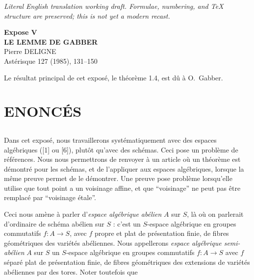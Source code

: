 \documentclass[12pt,a4paper]{article}
\theoremstyle{plain}
\theoremstyle{definition}
\theoremstyle{remark}
\begin{document}
\begin{center}\small\emph{Literal English translation working draft. Formulae, numbering, and TeX structure are preserved; this is not yet a modern recast.}\end{center}
\vspace{0.5em}


\begin{center}
{\Large\bf Expose V}\\[0.5em]
{\LARGE\bf LE LEMME DE GABBER}\\[1em]
{\large Pierre DELIGNE}\\[1em]
{\small Astérisque 127 (1985), 131--150}
\end{center}

\vspace{1em}

\begin{center}
Le résultat principal de cet exposé, le théorème 1.4, est dû à O.~Gabber.
\end{center}

\section{ENONCÉS}

\subsection{} Dans cet exposé, nous travaillerons systématiquement avec des espaces algébriques ([1] ou [6]), plutôt qu'avec des schémas. Ceci pose un problème de références. Nous nous permettrons de renvoyer à un article où un théorème est démontré pour les schémas, et de l'appliquer aux espaces algébriques, lorsque la même preuve permet de le démontrer. Une preuve pose problème lorsqu'elle utilise que tout point a un voisinage affine, et que ``voisinage'' ne peut pas être remplacé par ``voisinage étale''.

Ceci nous amène à parler d'\emph{espace algébrique abélien} $A$ sur $S$, là où on parlerait d'ordinaire de schéma abélien sur $S$ : c'est un $S$-espace algébrique en groupes commutatifs $f : A \to S$, avec $f$ propre et plat de présentation finie, de fibres géométriques des variétés abéliennes. Nous appellerons \emph{espace algébrique semi-abélien} $A$ sur $S$ un $S$-espace algébrique en groupes commutatifs $f : A \to S$ avec $f$ séparé plat de présentation finie, de fibres géométriques des extensions de variétés abéliennes par des tores. Noter toutefois que
\end{document}
